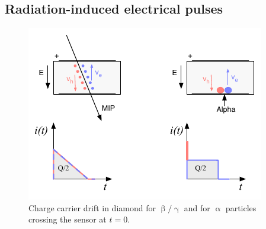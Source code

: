 

\subsection{Radiation-induced electrical pulses}

\begin{figure}[!t]
\begin{center}
\includegraphics[width=0.8\linewidth]{02_pulse_formation/pics/plots/driftboth}
\caption{Charge carrier drift in diamond for $\upbeta/\upgamma$ and for $\upalpha$ particles crossing the sensor at $t=0$.}
\label{fig:drift}
\end{center}
\end{figure}

